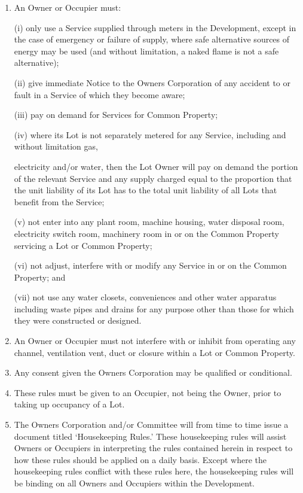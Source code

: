 \documentclass{article}
\begin{document}
\begin{enumerate}[label=\arabic*.]
\begin{enumerate}[label=\arabic{enumi}.\arabic*.]
\begin{enumerate}[label=(\arabic*)]
\begin{enumerate}[label=(\alph*)]
(iii) any support or shelter provided by that Lot or the Common Property for any other Lot or the Common Property is interfered with.

\item  An Owner or Occupier must:

(i) only use a Service supplied through meters in the Development, except in the case of emergency or failure of supply, where safe alternative sources of energy may be used (and without limitation, a naked flame is not a safe alternative);

(ii) give immediate Notice to the Owners Corporation of any accident to or fault in a Service of which they become aware;

(iii) pay on demand for Services for Common Property;

(iv) where its Lot is not separately metered for any Service, including and without limitation gas,
\newpage

electricity and/or water, then the Lot Owner will pay on demand the portion of the relevant Service and any supply charged equal to the proportion that the unit liability of its Lot has to the total unit liability of all Lots that benefit from the Service;

(v) not enter into any plant room, machine housing, water disposal room, electricity switch room, machinery room in or on the Common Property servicing a Lot or Common Property;

(vi) not adjust, interfere with or modify any Service in or on the Common Property; and

(vii) not use any water closets, conveniences and other water apparatus including waste pipes and drains for any purpose other than those for which they were constructed or designed.

\item  An Owner or Occupier must not interfere with or inhibit from operating any channel, ventilation vent, duct or closure within a Lot or Common Property.

\item  Any consent given the Owners Corporation may be qualified or conditional.

\item  These rules must be given to an Occupier, not being the Owner, prior to taking up occupancy of a Lot.

\item  The Owners Corporation and/or Committee will from time to time issue a document titled ‘Housekeeping Rules.’ These housekeeping rules will assist Owners or Occupiers in interpreting the rules contained herein in respect to how these rules should be applied on a daily basis. Except where the housekeeping rules conflict with these rules here, the housekeeping rules will be binding on all Owners and Occupiers within the Development.


\end{enumerate}
\end{enumerate}
\end{enumerate}
\end{enumerate}
\end{document}
